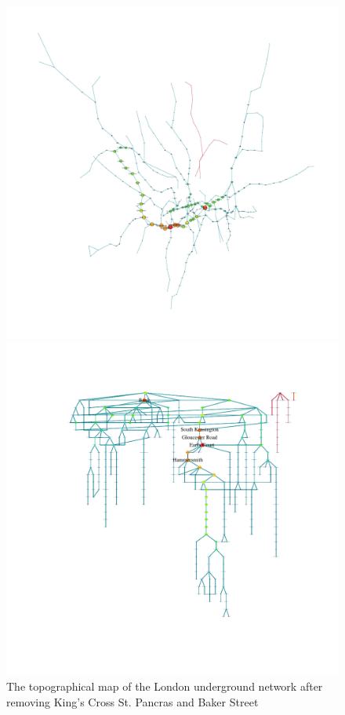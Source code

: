 \documentclass[a4paper,reqno,]{article}
\begin{document}
\begin{figure}[h]
\centering
\begin{minipage}[b]{0.49\textwidth}
\centering
    \captionsetup{width=.9\linewidth}
    \includegraphics[clip, trim=3cm 3cm 0.25cm 2cm,width=1\textwidth]{images/NW/2_1.pdf}
    \caption{The topographical map of the London underground network after removing King's Cross St. Pancras and Baker Street}\label{fig: 2_1}
\end{minipage}
\begin{minipage}[b]{0.5\textwidth}
\centering
    \captionsetup{width=.9\linewidth}
    \includegraphics[clip, trim=3cm 3cm 0.25cm 2cm,width=1\textwidth]{images/NW/2_2.pdf}

\end{minipage}
\end{figure}
\end{document}
